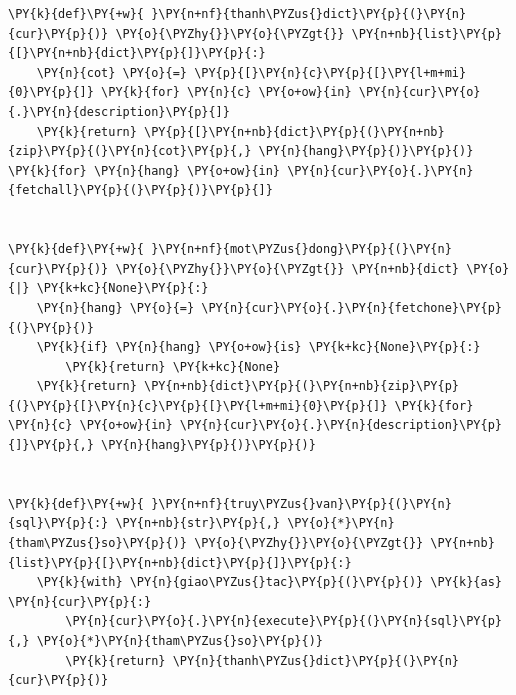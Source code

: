 \begin{Verbatim}[commandchars=\\\{\},frame=single,framerule=0.3pt,rulecolor=\color{black!40},fontsize=\footnotesize,breaklines=true]
\PY{k}{def}\PY{+w}{ }\PY{n+nf}{thanh\PYZus{}dict}\PY{p}{(}\PY{n}{cur}\PY{p}{)} \PY{o}{\PYZhy{}}\PY{o}{\PYZgt{}} \PY{n+nb}{list}\PY{p}{[}\PY{n+nb}{dict}\PY{p}{]}\PY{p}{:}
    \PY{n}{cot} \PY{o}{=} \PY{p}{[}\PY{n}{c}\PY{p}{[}\PY{l+m+mi}{0}\PY{p}{]} \PY{k}{for} \PY{n}{c} \PY{o+ow}{in} \PY{n}{cur}\PY{o}{.}\PY{n}{description}\PY{p}{]}
    \PY{k}{return} \PY{p}{[}\PY{n+nb}{dict}\PY{p}{(}\PY{n+nb}{zip}\PY{p}{(}\PY{n}{cot}\PY{p}{,} \PY{n}{hang}\PY{p}{)}\PY{p}{)} \PY{k}{for} \PY{n}{hang} \PY{o+ow}{in} \PY{n}{cur}\PY{o}{.}\PY{n}{fetchall}\PY{p}{(}\PY{p}{)}\PY{p}{]}


\PY{k}{def}\PY{+w}{ }\PY{n+nf}{mot\PYZus{}dong}\PY{p}{(}\PY{n}{cur}\PY{p}{)} \PY{o}{\PYZhy{}}\PY{o}{\PYZgt{}} \PY{n+nb}{dict} \PY{o}{|} \PY{k+kc}{None}\PY{p}{:}
    \PY{n}{hang} \PY{o}{=} \PY{n}{cur}\PY{o}{.}\PY{n}{fetchone}\PY{p}{(}\PY{p}{)}
    \PY{k}{if} \PY{n}{hang} \PY{o+ow}{is} \PY{k+kc}{None}\PY{p}{:}
        \PY{k}{return} \PY{k+kc}{None}
    \PY{k}{return} \PY{n+nb}{dict}\PY{p}{(}\PY{n+nb}{zip}\PY{p}{(}\PY{p}{[}\PY{n}{c}\PY{p}{[}\PY{l+m+mi}{0}\PY{p}{]} \PY{k}{for} \PY{n}{c} \PY{o+ow}{in} \PY{n}{cur}\PY{o}{.}\PY{n}{description}\PY{p}{]}\PY{p}{,} \PY{n}{hang}\PY{p}{)}\PY{p}{)}


\PY{k}{def}\PY{+w}{ }\PY{n+nf}{truy\PYZus{}van}\PY{p}{(}\PY{n}{sql}\PY{p}{:} \PY{n+nb}{str}\PY{p}{,} \PY{o}{*}\PY{n}{tham\PYZus{}so}\PY{p}{)} \PY{o}{\PYZhy{}}\PY{o}{\PYZgt{}} \PY{n+nb}{list}\PY{p}{[}\PY{n+nb}{dict}\PY{p}{]}\PY{p}{:}
    \PY{k}{with} \PY{n}{giao\PYZus{}tac}\PY{p}{(}\PY{p}{)} \PY{k}{as} \PY{n}{cur}\PY{p}{:}
        \PY{n}{cur}\PY{o}{.}\PY{n}{execute}\PY{p}{(}\PY{n}{sql}\PY{p}{,} \PY{o}{*}\PY{n}{tham\PYZus{}so}\PY{p}{)}
        \PY{k}{return} \PY{n}{thanh\PYZus{}dict}\PY{p}{(}\PY{n}{cur}\PY{p}{)}



\end{Verbatim}
